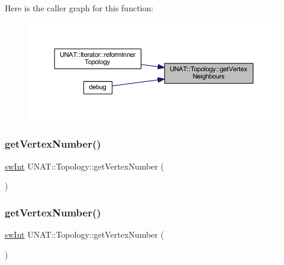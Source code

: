 Here is the caller graph for this function\+:
\nopagebreak
\begin{figure}[H]
\begin{center}
\leavevmode
\includegraphics[width=350pt]{classUNAT_1_1Topology_ae41f724783379d204fa64cba52b22395_icgraph}
\end{center}
\end{figure}
\mbox{\label{classUNAT_1_1Topology_a7d1d4d508b6e0a44fb0b5f6e6f26a8a5}} 
\subsubsection{\texorpdfstring{getVertexNumber()}{getVertexNumber()}\hspace{0.1cm}{\footnotesize\ttfamily [1/3]}}
{\footnotesize\ttfamily \mbox{\hyperlink{include_2swMacro_8h_a113cf5f6b5377cdf3fac6aa4e443e9aa}{sw\+Int}} U\+N\+A\+T\+::\+Topology\+::get\+Vertex\+Number (\begin{DoxyParamCaption}{ }\end{DoxyParamCaption})}

\mbox{\label{classUNAT_1_1Topology_a7d1d4d508b6e0a44fb0b5f6e6f26a8a5}} 
\subsubsection{\texorpdfstring{getVertexNumber()}{getVertexNumber()}\hspace{0.1cm}{\footnotesize\ttfamily [2/3]}}
{\footnotesize\ttfamily \mbox{\hyperlink{include_2swMacro_8h_a113cf5f6b5377cdf3fac6aa4e443e9aa}{sw\+Int}} U\+N\+A\+T\+::\+Topology\+::get\+Vertex\+Number (\begin{DoxyParamCaption}{ }\end{DoxyParamCaption})}

